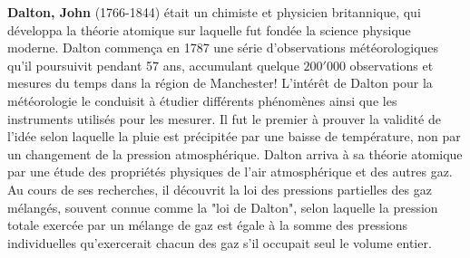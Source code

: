 \textbf{Dalton, John} (1766-1844) était un chimiste et physicien britannique, qui développa la théorie atomique sur laquelle fut fondée la science physique moderne. Dalton commença en 1787 une série d'observations météorologiques qu'il poursuivit pendant 57 ans, accumulant quelque $200'000$ observations et mesures du temps dans la région de Manchester! L'intérêt de Dalton pour la météorologie le conduisit à étudier différents phénomènes ainsi que les instruments utilisés pour les mesurer. Il fut le premier à prouver la validité de l'idée selon laquelle la pluie est précipitée par une baisse de température, non par un changement de la pression atmosphérique. Dalton arriva à sa théorie atomique par une étude des propriétés physiques de l'air atmosphérique et des autres gaz. Au cours de ses recherches, il découvrit la loi des pressions partielles des gaz mélangés, souvent connue comme la "loi de Dalton", selon laquelle la pression totale exercée par un mélange de gaz est égale à la somme des pressions individuelles qu'exercerait chacun des gaz s'il occupait seul le volume entier.

